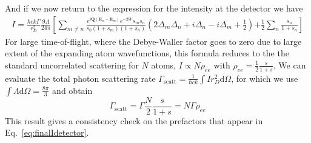 \documentclass[11pt,letter]{article}
\newcommand{\bv}[1]{\ensuremath{\bm{#1}}}
\newcommand{\iisat}{\ensuremath{I_{\mathrm{p}}/I_{\mathrm{sat}}}}
\begin{document}
And if we now return to the expression for the intensity at the detector we
have 
\begin{multline}
 I   = 
 \frac{\hbar c k \Gamma}{r_{D}^{2}}  
    \frac{9\Lambda}{24\pi} \left[ 
  \sum_{m\neq n}  
    \frac{
       e^{ i \bv{Q}( \bv{R}_{n} - \bv{R}_{m} ) } e^{-2W} 
    s_{m} s_{n} } { s_{0} ( 1+s_{m} )( 1+s_{n} ) }
    \left(
        2\Delta_{m} \Delta_{n}  
      + i  \Delta_{n} 
      - i  \Delta_{m} 
      + \frac{1}{2}  
    \right)  \right. 
 \left.
  + \frac{1}{2} 
  \sum_{ n}  
    \frac{ s_{n} } { 1+s_{n} }
        \right]
\label{eq:finalIdetector}
\end{multline} 
%
For large time-of-flight, where the Debye-Waller factor goes to zero due to
large extent of the expanding atom wavefunctions, this formula reduces to the
the standard uncorrelated scattering for $N$ atoms, $I\propto N\rho_{ee}$ with
$\rho_{ee} = \frac{1}{2} \frac{s}{1+s}$.  We can evaluate the total photon
scattering rate  $\Gamma_{\mathrm{scatt}}= \frac{1}{\hbar c k}\int I r_{D}^{2}
\mathrm{d}\Omega $,  for which we use $\int \Lambda \mathrm{d} \Omega =
\frac{8\pi}{3}$ and obtain
\begin{equation}
\Gamma_{\mathrm{scatt}} =  \Gamma \frac{N}{2} \frac{s}{1+s} = N\Gamma \rho_{ee}
\end{equation}
This result gives a consistency check on the prefactors that appear in
Eq.~\ref{eq:finalIdetector}. 
 
\end{document}
